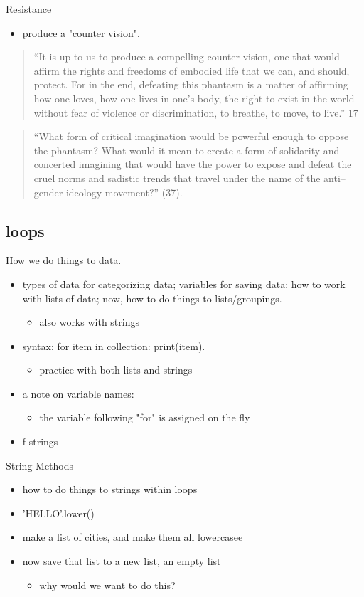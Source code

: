 \documentclass[11pt]{article}
\begin{document}
Resistance
\begin{itemize}
\item produce a "counter vision".
\end{itemize}

\begin{quote}
“It is up to us to produce a compelling counter-vision, one that would
affirm the rights and freedoms of embodied life that we can, and
should, protect. For in the end, defeating this phantasm is a matter
of affirming how one loves, how one lives in one’s body, the right to
exist in the world without fear of violence or discrimination, to
breathe, to move, to live.” 17
\end{quote}

\begin{quote}
“What form of critical imagination would be powerful enough to oppose
the phantasm? What would it mean to create a form of solidarity and
concerted imagining that would have the power to expose and defeat the
cruel norms and sadistic trends that travel under the name of the
anti–gender ideology movement?” (37).
\end{quote}

\subsection{loops}
\label{sec:orgf0cc56a}
How we do things to data.
\begin{itemize}
\item types of data for categorizing data; variables for saving data; how
to work with lists of data; now, how to do things to
lists/groupings.
\begin{itemize}
\item also works with strings
\end{itemize}
\item syntax: for item in collection: print(item).
\begin{itemize}
\item practice with both lists and strings
\end{itemize}
\item a note on variable names:
\begin{itemize}
\item the variable following "for" is assigned on the fly
\end{itemize}
\item f-strings
\end{itemize}

String Methods
\begin{itemize}
\item how to do things to strings within loops
\item 'HELLO'.lower()
\item make a list of cities, and make them all lowercasee
\item now save that list to a new list, an empty list
\begin{itemize}
\item why would we want to do this?
\end{itemize}
\end{itemize}
\end{document}
